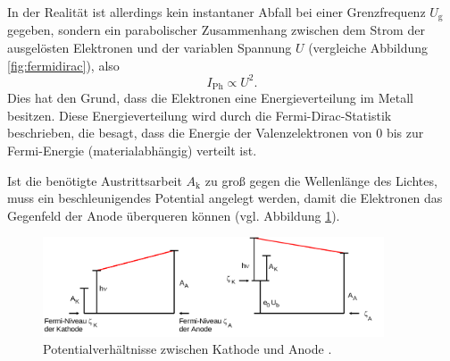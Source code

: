 In der Realität ist allerdings kein instantaner Abfall bei einer Grenzfrequenz $U_{\mathrm{g}}$
gegeben, sondern ein parabolischer Zusammenhang zwischen dem Strom der ausgelösten Elektronen
und der variablen Spannung $U$ (vergleiche Abbildung \ref{fig:fermidirac}), also
\begin{equation*}
	I_{\mathrm{Ph}} \propto U^2 \mathrm{.}
\end{equation*}
Dies hat den Grund, dass die Elektronen eine Energieverteilung im Metall besitzen. Diese
Energieverteilung wird durch die Fermi-Dirac-Statistik beschrieben, die besagt, dass die
Energie der Valenzelektronen von 0 bis zur Fermi-Energie (materialabhängig) verteilt ist.

Ist die benötigte Austrittsarbeit $A_{\mathrm{k}}$ zu groß gegen die Wellenlänge des Lichtes,
muss ein beschleunigendes Potential angelegt werden, damit die Elektronen das Gegenfeld der
Anode überqueren können (vgl. Abbildung \ref{fig:potentialverteilung}).
\begin{figure}
  \centering
  \includegraphics[width=0.90\textwidth]{Bilder/fermi.png}
  \caption{Potentialverhältnisse zwischen Kathode und Anode \cite{Anleitung}.}
  \label{fig:potentialverteilung}
\end{figure}
